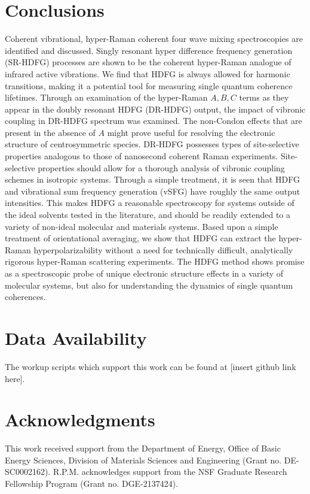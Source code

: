 \documentclass[aip, jcp, reprint, onecolumn]{revtex4-2}
\begin{document}
\section{Conclusions}
Coherent vibrational, hyper-Raman coherent four wave mixing spectroscopies are identified and discussed.
Singly resonant hyper difference frequency generation (SR-HDFG) processes are shown to be the coherent hyper-Raman analogue of infrared active vibrations.
We find that HDFG is always allowed for harmonic transitions, making it a potential tool for measuring single quantum coherence lifetimes. 
Through an examination of the hyper-Raman $A,B,C$ terms as they appear in the doubly resonant HDFG (DR-HDFG) output, the impact of vibronic coupling in DR-HDFG spectrum was examined.
The non-Condon effects that are present in the absence of $A$ might prove useful for resolving the electronic structure of centrosymmetric species.
DR-HDFG possesses types of site-selective properties analogous to those of nanosecond coherent Raman experiments. 
Site-selective properties should allow for a thorough analysis of vibronic coupling schemes in isotropic systems.
Through a simple treatment, it is seen that HDFG and vibrational sum frequency generation (vSFG) have roughly the same output intensities. 
This makes HDFG a reasonable spectroscopy for systems outside of the ideal solvents tested in the literature, and should be readily extended to a variety of non-ideal molecular and materials systems. 
Based upon a simple treatment of orientational averaging, we show that HDFG can extract the hyper-Raman hyperpolarizability without a need for technically difficult, analytically rigorous hyper-Raman scattering experiments. 
The HDFG method shows promise as a spectroscopic probe of unique electronic structure effects in a variety of molecular systems, but also for understanding the dynamics of single quantum coherences. 
\section{Data Availability}
The workup scripts which support this work can be found at [insert github link here].

\section{Acknowledgments}
This work received support from the Department of Energy, Office of Basic Energy Sciences, Division of Materials Sciences and Engineering (Grant no. DE-SC0002162).
R.P.M. acknowledges support from the NSF Graduate Research Fellowship Program (Grant no. DGE-2137424). 
\end{document}
